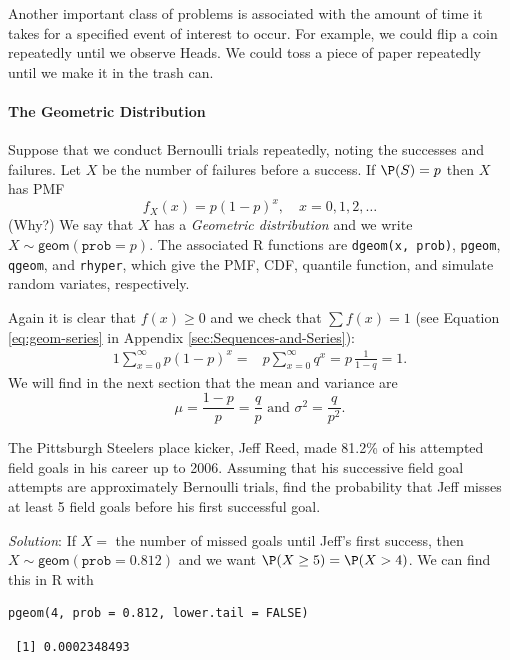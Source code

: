 \documentclass[captions=tableheading]{scrbook}
\begin{document}
Another important class of problems is associated with the amount of time it takes for a specified event of interest to occur. For example, we could flip a coin repeatedly until we observe Heads. We could toss a piece of paper repeatedly until we make it in the trash can.

\paragraph*{The Geometric Distribution}
\label{sub:The-Geometric-Distribution}

Suppose that we conduct Bernoulli trials repeatedly, noting the successes and failures. Let \(X\) be the number of failures before a success. If \(\P(S)=p\) then \(X\) has PMF
\begin{equation}
f_{X}(x)=p(1-p)^{x},\quad x=0,1,2,\ldots
\end{equation}
(Why?) We say that \(X\) has a \emph{Geometric distribution} and we write \(X\sim\mathsf{geom}(\mathtt{prob}=p)\). The associated \textsf{R} functions are \texttt{dgeom(x, prob)}, \texttt{pgeom}, \texttt{qgeom}, and \texttt{rhyper}, which give the PMF, CDF, quantile function, and simulate random variates, respectively.

Again it is clear that \(f(x)\geq0\) and we check that \(\sum f(x)=1\) (see Equation \ref{eq:geom-series} in Appendix \ref{sec:Sequences-and-Series}):
\begin{alignat*}{1}
\sum_{x=0}^{\infty}p(1-p)^{x}= & p\sum_{x=0}^{\infty}q^{x}=p\,\frac{1}{1-q}=1.
\end{alignat*}
We will find in the next section that the mean and variance are
\begin{equation}
\mu=\frac{1-p}{p}=\frac{q}{p}\mbox{ and }\sigma^{2}=\frac{q}{p^{2}}.
\end{equation}


\begin{example}
The Pittsburgh Steelers place kicker, Jeff Reed, made 81.2\% of his attempted field goals in his career up to 2006. Assuming that his successive field goal attempts are approximately Bernoulli trials, find the probability that Jeff misses at least 5 field goals before his first successful goal.

\emph{Solution}: If \(X=\) the number of missed goals until Jeff's first success, then \(X\sim\mathsf{geom}(\mathtt{prob}=0.812)\) and we want \(\P(X\geq5)=\P(X>4)\). We can find this in \textsf{R} with


\begin{verbatim}
pgeom(4, prob = 0.812, lower.tail = FALSE)
\end{verbatim}

\begin{verbatim}
 [1] 0.0002348493
\end{verbatim}

\end{example}
\end{document}

